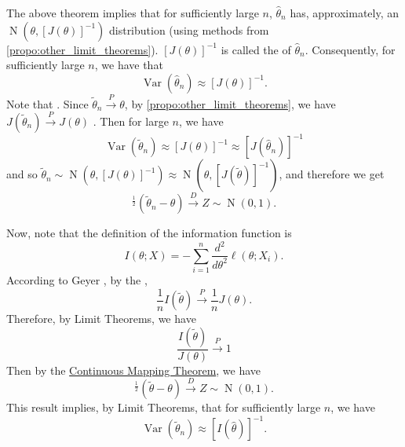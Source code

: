 \documentclass[notoc,notitlepage]{tufte-book}
\DeclareMathOperator{\Nor}{N }
\DeclareMathOperator{\Var}{Var }
\newcommand{\convd}{\overset{D}{\to}}
\newcommand{\convp}{\overset{P}{\to}}
\begin{document}
\begin{note}
  The above theorem implies that for sufficiently large $n$, $\hat{\theta}_n$ has, approximately, an $\Nor\left(\theta, [J(\theta)]^{-1}\right)$ distribution (using methods from \\ \noindent\cref{propo:other_limit_theorems}). $[J(\theta)]^{-1}$ is called the  of $\hat{\theta}_n$. Consequently, for sufficiently large $n$, we have that
  \begin{equation*}
    \Var\left(\hat{\theta}_n\right) \approx [ J(\theta) ]^{-1}.
  \end{equation*}
  Note that . Since $\tilde{\theta}_n \convp \theta$, by \cref{propo:other_limit_theorems}, we have $J(\tilde{\theta}_n) \convp J(\theta)$ . Then for large $n$, we have
  \begin{equation*}
    \Var(\tilde{\theta}_n) \approx [ J(\theta) ]^{-1} \approx [ J(\hat{\theta}_n) ]^{-1}
  \end{equation*}
  and so $\tilde{\theta}_n \sim \Nor( \theta, [ J(\theta) ]^{-1} ) \approx \Nor( \theta, [J(\tilde{\theta})]^{-1} )$, and therefore we get
  \begin{equation*}
    [J(\tilde{\theta}_n)]^{\frac{1}{2}} (\tilde{\theta}_n - \theta) \convd Z \sim \Nor(0, 1).
  \end{equation*}

  Now, note that the definition of the information function is
  \begin{equation*}
    I(\theta; X) = - \sum_{i=1}^{n} \frac{d^2}{d\theta^2} \ell(\theta; X_i).
  \end{equation*}
  According to Geyer \cite{Geyer2007}, by the ,
  \begin{equation*}
    \frac{1}{n} I(\tilde{\theta}) \convp \frac{1}{n} J(\theta).
  \end{equation*}
  Therefore, by Limit Theorems, we have
  \begin{equation*}
    \frac{I(\tilde{\theta})}{J(\theta)} \convp 1
  \end{equation*}
  Then by the \hyperref[propo:other_limit_theorems]{Continuous Mapping Theorem}, we have
  \begin{equation*}
    [I(\tilde{\theta})]^{\frac{1}{2}} ( \tilde{\theta} - \theta ) \convd Z \sim \Nor(0, 1).
  \end{equation*}
  This result implies, by Limit Theorems, that for sufficiently large $n$, we have
  \begin{equation*}
    \Var(\tilde{\theta}_n) \approx [ I(\hat{\theta}) ]^{-1}.
  \end{equation*}
\end{note}
\end{document}

